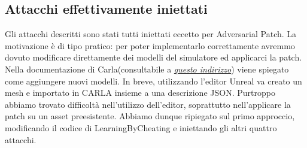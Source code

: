 \subsection{Attacchi effettivamente iniettati}
Gli attacchi  descritti sono stati tutti iniettati eccetto per Adversarial Patch. La motivazione è di tipo pratico: per poter implementarlo correttamente
avremmo dovuto modificare direttamente dei modelli del simulatore ed applicarci la patch. Nella documentazione di Carla(consultabile a \href{https://carla.readthedocs.io/en/latest/}{\emph{questo indirizzo}})
viene spiegato come aggiungere nuovi modelli. In breve, utilizzando l'editor Unreal va creato un mesh e importato in CARLA insieme 
a una descrizione JSON. Purtroppo abbiamo trovato difficoltà nell'utilizzo dell'editor, soprattutto nell'applicare la patch su un asset preesistente. Abbiamo dunque
ripiegato sul primo approccio, modificando il codice di LearningByCheating e iniettando gli altri quattro attacchi.

